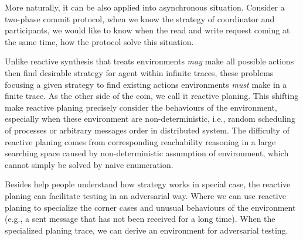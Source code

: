 \begin{example} More naturally, it can be also applied into asynchronous situation. Consider a two-phase commit protocol, when we know the strategy of coordinator and participants, we would like to know when the read and write request coming at the same time, how the protocol solve this situation. 
\end{example}

Unlike reactive synthesis that treats environments \emph{may} make all possible actions then find desirable strategy for agent within infinite traces, these problems focusing a given strategy to find existing actions environments \emph{must} make in a finite trace. As the other side of the coin, we call it reactive planing. This shifting make reactive planing precisely consider the behaviours of the environment, especially when these environment are non-deterministic, i.e., random scheduling of processes or arbitrary messages order in distributed system.
The difficulty of reactive planing comes from corresponding reachability reasoning in a large searching space caused by non-deterministic assumption of environment, which cannot simply be solved by naive enumeration.

Besides help people understand how strategy works in special case, the reactive planing can facilitate testing in an adversarial way. Where we can use reactive planing to specialize the corner cases and unusual behaviours of the environment (e.g., a sent message that has not been received for a long time). When the specialized planing trace, we can derive an environment for adversarial testing.